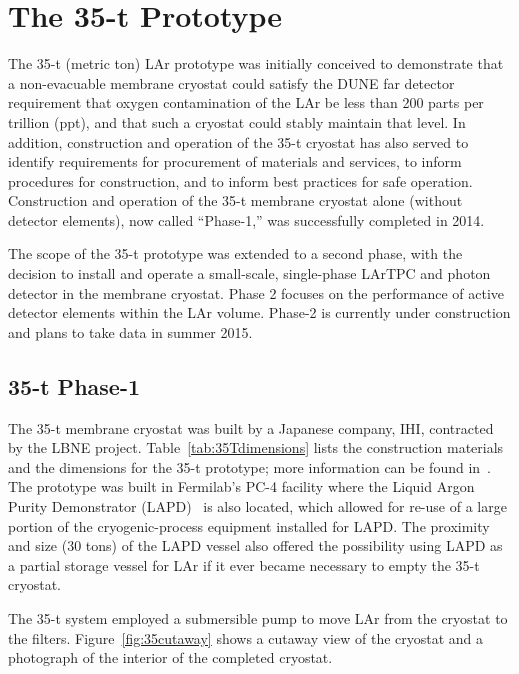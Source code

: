 \section{The 35-t Prototype}
\label{sec:proto-35t}

The 35-t (metric ton) LAr prototype was initially conceived to demonstrate that a non-evacuable
membrane cryostat could satisfy the DUNE far detector requirement that oxygen contamination
of the LAr be less than 200 parts per trillion (ppt), and that such a cryostat
could stably maintain that level.  In addition, construction and operation of the
35-t cryostat has also served to identify requirements for procurement of materials and services,
to inform procedures for construction, and to inform best practices for safe operation.
Construction and operation of the 35-t membrane cryostat alone (without detector elements), now called ``Phase-1,''
was successfully completed in 2014.

The scope of the 35-t prototype was extended to a second phase, with the decision to install
and operate a small-scale, single-phase LArTPC and photon detector in the membrane cryostat.
Phase 2 focuses on the performance of active detector elements within the LAr volume.
Phase-2 is currently under construction and plans to take data in summer 2015.

\subsection{35-t Phase-1}

The 35-t membrane cryostat was built by a Japanese company, IHI\cite{bib:ihicorp},
contracted by the LBNE project.  
Table~\ref{tab:35Tdimensions} lists the construction materials and the
dimensions for the 35-t prototype; more information can be found in~\cite{bib:membcryo1573}.
The prototype was built in Fermilab's PC-4 facility where the Liquid Argon Purity
Demonstrator (LAPD)~\cite{bib:lapdP07005} is also located, which allowed for re-use of a large portion
 of the cryogenic-process equipment installed for LAPD.  The proximity and size (30 tons) of the LAPD
 vessel also offered the possibility using LAPD as a partial storage vessel for LAr if it ever
 became necessary to empty the 35-t cryostat.

The 35-t system employed a submersible pump to move LAr from the cryostat to the filters.
Figure~\ref{fig:35cutaway} shows a cutaway view of the cryostat and a photograph of the interior
of the completed cryostat.

